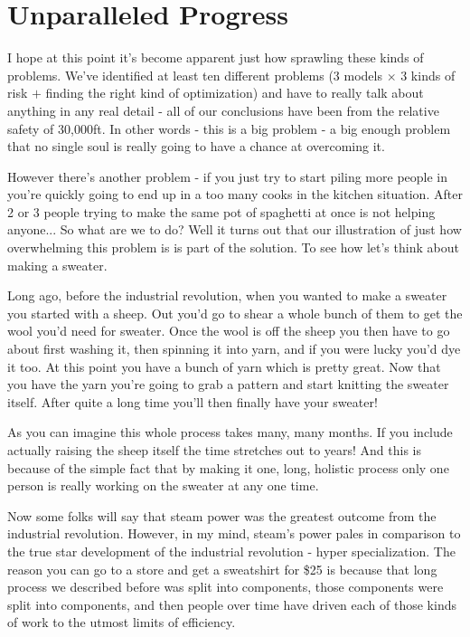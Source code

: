 \documentclass[11pt,a5paper]{book}
\begin{document}
\chapter{Unparalleled Progress}

I hope at this point it's become apparent just how sprawling these kinds of problems. We've identified at least ten different problems (3 models $\times$ 3 kinds of risk $+$ finding the right kind of optimization) and have to really talk about anything in any real detail - all of our conclusions have been from the relative safety of 30,000ft. In other words - this is a big problem - a big enough problem that no single soul is really going to have a chance at overcoming it. 
\newline

However there's another problem - if you just try to start piling more people in you're quickly going to end up in a too many cooks in the kitchen situation. After 2 or 3 people trying to make the same pot of spaghetti at once is not helping anyone... So what are we to do? Well it turns out that our illustration of just how overwhelming this problem is is part of the solution. To see how let's think about making a sweater.
\newline

Long ago, before the industrial revolution, when you wanted to make a sweater you started with a sheep. Out you'd go to shear a whole bunch of them to get the wool you'd need for sweater. Once the wool is off the sheep you then have to go about first washing it, then spinning it into yarn, and if you were lucky you'd dye it too. At this point you have a bunch of yarn which is pretty great. Now that you have the yarn you're going to grab a pattern and start knitting the sweater itself. After quite a long time you'll then finally have your sweater! 
\newline

As you can imagine this whole process takes many, many months. If you include actually raising the sheep itself the time stretches out to years! And this is because of the simple fact that by making it one, long, holistic process only one person is really working on the sweater at any one time. 
\newline

Now some folks will say that steam power was the greatest outcome from the industrial revolution. However, in my mind, steam's power pales in comparison to the true star development of the industrial revolution - hyper specialization. The reason you can go to a store and get a sweatshirt for \$25 is because that long process we described before was split into components, those components were split into components, and then people over time have driven each of those kinds of work to the utmost limits of efficiency.
\newline
\end{document}
